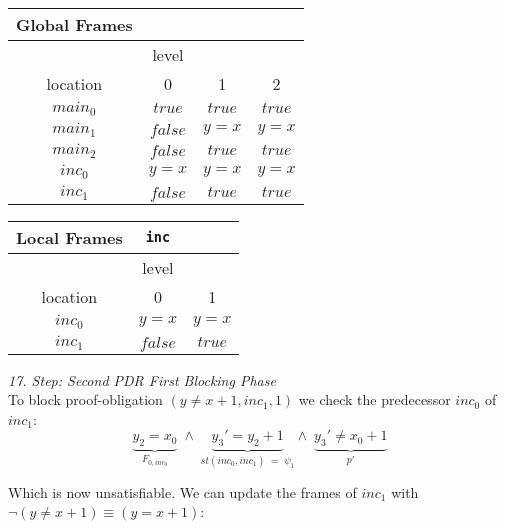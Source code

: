 \documentclass{article}
\begin{document}
\begin{minipage}{.4\textwidth}
	\setlength\tabcolsep{0.35em}
	\begin{center}
		\begin{tabu}{cccc}
			Global Frames \\
			\toprule
			& level \\
			\cmidrule(lr){2-4}
			location & 0 & 1 & 2 \\
			$main_0$ & $true$ & $true$ & $true$  \\
			$main_1$ & $false$ & $y = x$ & $y = x$\\
			$main_2$ & $false$ & $true$ & $true$ \\
			$inc_0$ & $y = x$ & $y = x$ & $y = x$ \\
			$inc_1$ & $false$ & $true$ & $true$\\
			\bottomrule
		\end{tabu}
	\end{center}
\end{minipage}
\hfill
\begin{minipage}{.5\textwidth}
	\setlength\tabcolsep{0.35em}
	\begin{center}
		\begin{tabu}{ccc}
			Local Frames & \texttt{inc}\\
			\toprule
			& level \\
			\cmidrule(lr){2-3}
			location & 0 & 1  \\
			$inc_0$ & $y = x$ & $y = x$  \\
			$inc_1$ & $false$ & $true$ \\
			\bottomrule
		\end{tabu}
	\end{center}	
\end{minipage}

\vspace*{1em}

\textsl{17. Step: Second PDR First Blocking Phase} \\
To block proof-obligation $(y \neq x + 1, inc_1, 1)$ we check the predecessor $inc_0$ of $inc_1$: \\
\begin{equation*}
\underbrace{y_2 = x_0}_{F_{0, inc_0}}\; \land \; \underbrace{y_3' = y_2 + 1}_{st(inc_0, inc_1)\; = \; \psi_1} \land \; \underbrace{y_3' \neq x_0 + 1}_{p'}
\end{equation*}

Which is now unsatisfiable. We can update the frames of $inc_1$ with $\neg(y \neq x + 1) \equiv (y = x + 1)$: \\ \\
\end{document}
